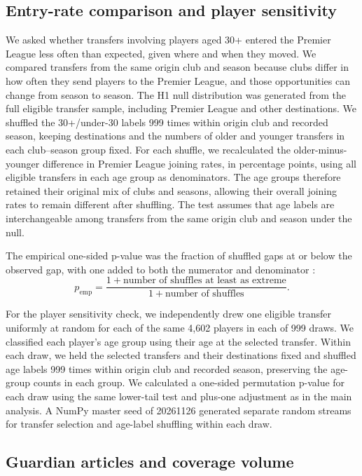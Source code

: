 \subsection*{Entry-rate comparison and player sensitivity}
We asked whether transfers involving players aged 30+ entered the Premier League less often than expected, given where and when they moved. We compared transfers from the same origin club and season because clubs differ in how often they send players to the Premier League, and those opportunities can change from season to season.
The H1 null distribution was generated from the full eligible transfer sample, including Premier League and other destinations. We shuffled the 30+/under-30 labels 999 times within origin club and recorded season, keeping destinations and the numbers of older and younger transfers in each club--season group fixed. For each shuffle, we recalculated the older-minus-younger difference in Premier League joining rates, in percentage points, using all eligible transfers in each age group as denominators. The age groups therefore retained their original mix of clubs and seasons, allowing their overall joining rates to remain different after shuffling. The test assumes that age labels are interchangeable among transfers from the same origin club and season under the null.

The empirical one-sided p-value was the fraction of shuffled gaps at or below the observed gap, with one added to both the numerator and denominator \cite{hemerik2018exact,phipson2010permutation}:
\begin{equation}
p_{\mathrm{emp}} =
\frac{1+\text{number of shuffles at least as extreme}}
     {1+\text{number of shuffles}}.
\label{eq:h1-empirical-p}
\end{equation}

For the player sensitivity check, we independently drew one eligible transfer uniformly at random for each of the same 4,602 players in each of 999 draws. We classified each player's age group using their age at the selected transfer. Within each draw, we held the selected transfers and their destinations fixed and shuffled age labels 999 times within origin club and recorded season, preserving the age-group counts in each group. We calculated a one-sided permutation p-value for each draw using the same lower-tail test and plus-one adjustment as in the main analysis. A NumPy master seed of 20261126 generated separate random streams for transfer selection and age-label shuffling within each draw.

\subsection*{Guardian articles and coverage volume}

